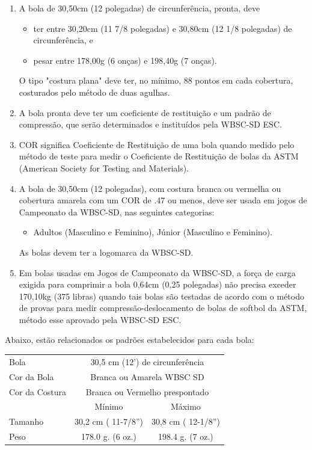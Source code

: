 \begin{enumerate}[label=(\arabic*)]
	\item  A bola de 30,50cm (12 polegadas) de circunferência, pronta, deve

	\begin{itemize}
		\item ter entre 30,20cm (11 7/8 polegadas) e 30,80cm (12 1/8 polegadas) de circunferência, e
		\item pesar entre 178,00g (6 \textonequarter{} onças) e 198,40g (7 onças).
	\end{itemize}


	O tipo "costura plana" deve ter, no mínimo, 88 pontos em cada cobertura, costurados pelo método de duas agulhas.

	\item  A bola pronta deve ter um coeficiente de restituição e um padrão de compressão, que serão determinados e instituídos pela WBSC-SD \gls{ESC}.

	\item  COR significa Coeficiente de Restituição de uma bola quando medido pelo método de teste para medir o Coeficiente de Restituição de bolas da ASTM (American Society for Testing and Materials).

	\item  A bola de 30,50cm (12 polegadas), com costura branca ou vermelha ou cobertura amarela com um COR de .47 ou menos, deve ser usada em jogos de Campeonato da WBSC-SD, nas seguintes categorias:
	\begin{itemize}
		\item Adultos (Masculino e Feminino), Júnior (Masculino e Feminino).
	\end{itemize}
	As bolas devem ter a logomarca da WBSC-SD.
	\item  Em bolas usadas em Jogos de Campeonato da WBSC-SD, a força de carga exigida para comprimir a bola 0,64cm (0,25 polegadas) não precisa exceder 170,10kg (375 libras) quando tais bolas são testadas de acordo com o método de provas para medir compressão-deslo\-ca\-men\-to de bolas de softbol da ASTM, método esse aprovado pela WBSC-SD \gls{ESC}.
\end{enumerate}

 Abaixo, estão relacionados os padrões estabelecidos para cada bola:

 \begin{center}
 \begin{tabular}{lcc}\hline
	Bola&  \multicolumn{2}{c}{30,5 cm (12') de circunferência}\\[2mm]
	Cor da Bola&  \multicolumn{2}{c}{Branca ou Amarela WBSC SD}\\[2mm]
	Cor da Costura &  \multicolumn{2}{c}{Branca ou Vermelho prespontado}\\[4mm]\hline
	& Mínimo & Máximo \\\hline\hline
	Tamanho  & 30,2 cm ( 11-7/8'') & 30,8 cm ( 12-1/8'')\\\hline
	Peso  & 178.0 g. (6 \textonequarter{}  oz.) & 198.4 g. (7 oz.)\\\hline
\end{tabular}
 \end{center}



